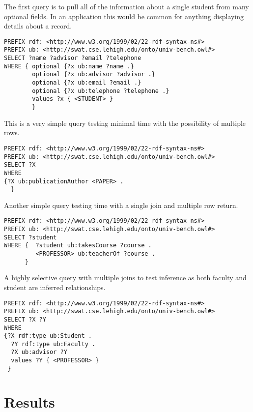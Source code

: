 \documentclass{llncs}
\begin{document}
\smallskip

The first query is to pull all of the information about a single student from many optional fields.  In an application this would be common for anything displaying details about a record.

\begin{lstlisting}[caption=Query 1]
PREFIX rdf: <http://www.w3.org/1999/02/22-rdf-syntax-ns#>
PREFIX ub: <http://swat.cse.lehigh.edu/onto/univ-bench.owl#>
SELECT ?name ?advisor ?email ?telephone
WHERE { optional {?x ub:name ?name .}
        optional {?x ub:advisor ?advisor .}
        optional {?x ub:email ?email .}
        optional {?x ub:telephone ?telephone .}
        values ?x { <STUDENT> }
        }
\end{lstlisting}

\smallskip

This is a very simple query testing minimal time with the possibility of multiple rows.

\begin{lstlisting}[caption=Query 2]
PREFIX rdf: <http://www.w3.org/1999/02/22-rdf-syntax-ns#>
PREFIX ub: <http://swat.cse.lehigh.edu/onto/univ-bench.owl#>
SELECT ?X
WHERE
{?X ub:publicationAuthor <PAPER> .
  }
\end{lstlisting}
\smallskip

Another simple query testing time with a single join and multiple row return.

\begin{lstlisting}[caption=Query 3]
PREFIX rdf: <http://www.w3.org/1999/02/22-rdf-syntax-ns#>
PREFIX ub: <http://swat.cse.lehigh.edu/onto/univ-bench.owl#>
SELECT ?student
WHERE {  ?student ub:takesCourse ?course .
         <PROFESSOR> ub:teacherOf ?course .
      }
\end{lstlisting}

\smallskip

A highly selective query with multiple joins to test inference as both faculty and student are inferred relationships.

\begin{lstlisting}[caption=Query 4]
PREFIX rdf: <http://www.w3.org/1999/02/22-rdf-syntax-ns#>
PREFIX ub: <http://swat.cse.lehigh.edu/onto/univ-bench.owl#>
SELECT ?X ?Y
WHERE
{?X rdf:type ub:Student .
  ?Y rdf:type ub:Faculty .
  ?X ub:advisor ?Y 
  values ?Y { <PROFESSOR> }
 }
\end{lstlisting}
\clearpage

\section{Results}
\end{document}
